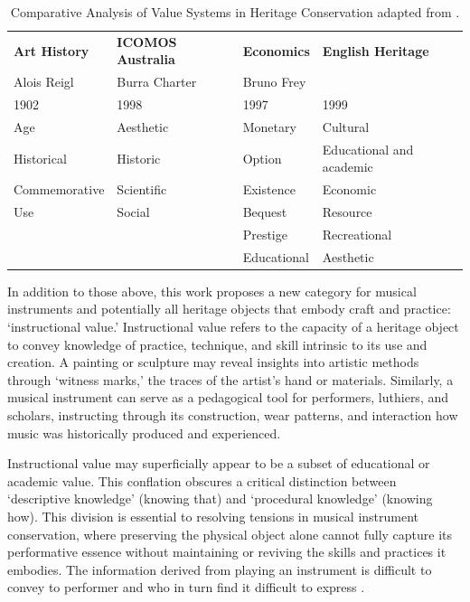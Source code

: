 \begin{table}[h]
	\small
	\centering
	\begin{tabular}{llll}
		\toprule
		\textbf{Art History} & \textbf{ICOMOS Australia} & \textbf{Economics} &
		\textbf{English Heritage}                                                                        \\
		Alois Reigl          & Burra Charter             & Bruno Frey         &                          \\
		1902                 & 1998                      & 1997               & 1999                     \\\hline
		Age                  & Aesthetic                 & Monetary           & Cultural                 \\
		Historical           & Historic                  & Option             & Educational and academic \\
		Commemorative        & Scientific                & Existence          & Economic                 \\
		Use                  & Social                    & Bequest            & Resource                 \\
		                     &                           & Prestige           & Recreational             \\
		                     &                           & Educational        & Aesthetic                \\
		\bottomrule
	\end{tabular}
	\caption{Comparative Analysis of Value Systems in Heritage Conservation
		adapted from \textcite{avrami_values_2000}.}
	\label{tab:values_comparison}
\end{table}

In addition to those above, this work proposes a new category for musical
instruments and potentially all heritage objects that embody craft and practice:
`instructional value.' Instructional value refers to the capacity of a heritage
object to convey knowledge of practice, technique, and skill intrinsic to its
use and creation. A painting or sculpture may reveal insights into artistic
methods through `witness marks,' the traces of the artist’s hand or materials.
Similarly, a musical instrument can serve as a pedagogical tool for performers,
luthiers, and scholars, instructing through its construction, wear patterns, and
interaction how music was historically produced and experienced.

Instructional value may superficially appear to be a subset of educational or
academic value. This conflation obscures a critical distinction between
`descriptive knowledge' (knowing that) and `procedural knowledge' (knowing how).
This division is essential to resolving tensions in musical instrument
conservation, where preserving the physical object alone cannot fully capture
its performative essence without maintaining or reviving the skills and
practices it embodies. The information derived from playing an instrument is
difficult to convey to performer and who in turn find it difficult to express
\cite{lamb_play_2007}.

